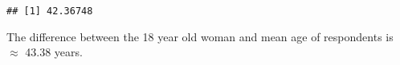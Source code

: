 \documentclass[]{article}
\newenvironment{Shaded}{\begin{snugshade}}{\end{snugshade}}
\newcommand{\KeywordTok}[1]{\textcolor[rgb]{0.13,0.29,0.53}{\textbf{#1}}}
\newcommand{\DataTypeTok}[1]{\textcolor[rgb]{0.13,0.29,0.53}{#1}}
\newcommand{\FloatTok}[1]{\textcolor[rgb]{0.00,0.00,0.81}{#1}}
\newcommand{\OtherTok}[1]{\textcolor[rgb]{0.56,0.35,0.01}{#1}}
\newcommand{\OperatorTok}[1]{\textcolor[rgb]{0.81,0.36,0.00}{\textbf{#1}}}
\newcommand{\NormalTok}[1]{#1}
\begin{document}
\begin{Shaded}
\end{Shaded}

\begin{verbatim}
## [1] 42.36748
\end{verbatim}

The difference between the 18 year old woman and mean age of respondents
is \(\approx\) 43.38 years.
\end{document}
